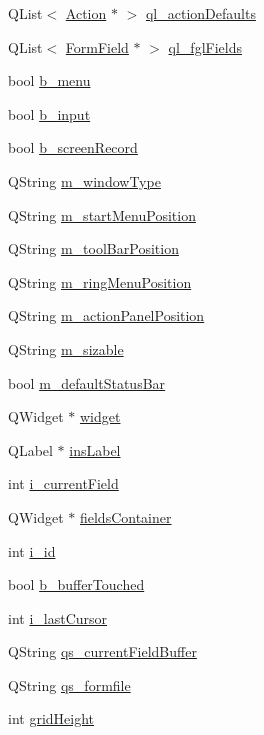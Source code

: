 \begin{DoxyCompactItemize}
\item 
QList$<$ \hyperlink{classAction}{Action} $\ast$ $>$ \hyperlink{classFglForm_a6b78dae39bcab3791a9acc99a3b8248d}{ql\_\-actionDefaults}
\item 
QList$<$ \hyperlink{classFormField}{FormField} $\ast$ $>$ \hyperlink{classFglForm_a1d775e481b65ae50b2a557fa9ae975c5}{ql\_\-fglFields}
\item 
bool \hyperlink{classFglForm_ac1f8bea18516701b1192825f83e962d7}{b\_\-menu}
\item 
bool \hyperlink{classFglForm_a348ba4d61a2c9e18513ac88c919015c0}{b\_\-input}
\item 
bool \hyperlink{classFglForm_a656061ca98f40226c99fa61b12ced56c}{b\_\-screenRecord}
\item 
QString \hyperlink{classFglForm_aff3b675ee7063af63839e029f66b4075}{m\_\-windowType}
\item 
QString \hyperlink{classFglForm_a94e20a9c06c349d6e7c5ec47c03de4a6}{m\_\-startMenuPosition}
\item 
QString \hyperlink{classFglForm_a0008c6a1c3362095ebd5ab0601910003}{m\_\-toolBarPosition}
\item 
QString \hyperlink{classFglForm_a25371a3df6cb3e1dc66e141bb2a9dff1}{m\_\-ringMenuPosition}
\item 
QString \hyperlink{classFglForm_af3882d981d23db8e6dca26a44ac23051}{m\_\-actionPanelPosition}
\item 
QString \hyperlink{classFglForm_a7861c07caeb306c5ae9f2012ce73bff7}{m\_\-sizable}
\item 
bool \hyperlink{classFglForm_a2e877386e4ba441d929c0c35d48620cb}{m\_\-defaultStatusBar}
\item 
QWidget $\ast$ \hyperlink{classFglForm_a15cd139d56b40da6de43a6bb4d438c0d}{widget}
\item 
QLabel $\ast$ \hyperlink{classFglForm_a72467aa7c8750f7075b7ba7fc67a29bb}{insLabel}
\item 
int \hyperlink{classFglForm_ae7e903902c63ce3179656df4b684038f}{i\_\-currentField}
\item 
QWidget $\ast$ \hyperlink{classFglForm_a67c8174c2d61e69e76c3206766fe3ac9}{fieldsContainer}
\item 
int \hyperlink{classFglForm_a6142cd4363f16562e52631f1987b46c3}{i\_\-id}
\item 
bool \hyperlink{classFglForm_a4bddddc3ca57303fbf3d55394e260a00}{b\_\-bufferTouched}
\item 
int \hyperlink{classFglForm_a9f622b4a17fcad8c785e119d19abe326}{i\_\-lastCursor}
\item 
QString \hyperlink{classFglForm_a04725912842355fc88fa7412e435f4a9}{qs\_\-currentFieldBuffer}
\item 
QString \hyperlink{classFglForm_a1bca5dcb62f50a5939c295b7c0d662d2}{qs\_\-formfile}
\item 
int \hyperlink{classFglForm_a9dc5de78bd4b0d7024831926f9cdc7d9}{gridHeight}
\end{DoxyCompactItemize}


